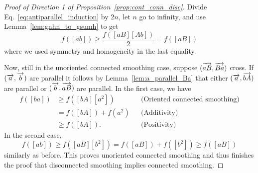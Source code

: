 \begin{proof}[Proof of Direction 1 of Proposition~\ref{prop:cont_conn_disc}]
                				Divide Eq.~\eqref{eq:antiparallel_induction} by $2n$, let $n$ go to
				infinity, and use Lemma~\ref{lem:gnhn_to_gsumh} to get
				\[
				f([ab]) \geq \frac{f([aB] [Ab])}{2} = f([aB])
				\]
				where we used symmetry and homogeneity in the last equality.
			

				Now, still in the unoriented connected smoothing case, suppose
				$(\overrightarrow{aB},\overrightarrow{Ba})$ cross.
				If $(\overrightarrow{a},\overrightarrow{b})$ are parallel it follows by Lemma~\ref{lem:a_parallel_Ba} that either $(\overrightarrow{a},\overrightarrow{bA})$ are parallel or $(\overrightarrow{b}, \overrightarrow{aB})$ are parallel.
				In the first case, we have 
\begin{align*}
f([ba]) 
& \geq f([bA][a^2]) && \text{(Oriented connected smoothing)}\\
&= f([bA]) + f(a^2)  && \text{(Additivity)} \\
&\geq f([bA]). && \text{(Positivity)}
\end{align*}
				In the second case,
				\[
				f([ab]) \geq f([aB][b^2]) =f([aB]) + f([b^2]) \geq f([aB])
				\]
				similarly as before. This proves unoriented connected smoothing and thus finishes the proof that disconnected smoothing implies connected smoothing.
\end{proof}	
		
